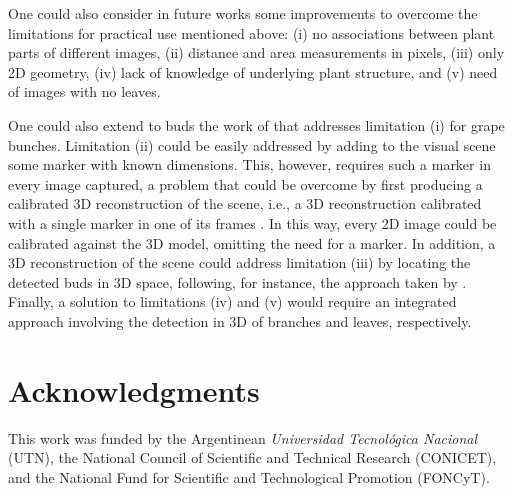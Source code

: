 \documentclass[a4paper,authoryear,review]{elsarticle}
\begin{document}
	One could also consider in future works some improvements to overcome the limitations for practical use mentioned above: (i) no associations between plant parts of different images, (ii) distance and area measurements in pixels, (iii) only 2D geometry, (iv) lack of knowledge of underlying plant structure, and (v) need of images with no leaves. 
	
	One could also extend to buds the work of \citet{santos2020grape} that addresses limitation (i) for grape bunches. Limitation (ii) could be easily addressed by adding to the visual scene some marker with known dimensions. This, however, requires such a marker in every image captured, a problem that could be overcome by first producing a calibrated 3D reconstruction of the scene, i.e., a 3D reconstruction calibrated with a single marker in one of its frames \citep{hartley2003multiple, moons20093d}. In this way, every 2D image could be calibrated against the 3D model, omitting the need for a marker. In addition, a 3D reconstruction of the scene could address limitation (iii) by locating the detected buds in 3D space, following, for instance, the approach taken by \citet{diaz2018grapevine}. Finally, a solution to limitations (iv) and (v) would require an integrated approach involving the detection in 3D of branches and leaves, respectively. 
	
	\section*{Acknowledgments}
	
	This work was funded by the Argentinean \emph{Universidad Tecnológica Nacional} (UTN), the National Council of Scientific and Technical Research (CONICET), and the National Fund for Scientific and Technological Promotion (FONCyT).
	
	
	
\end{document}
